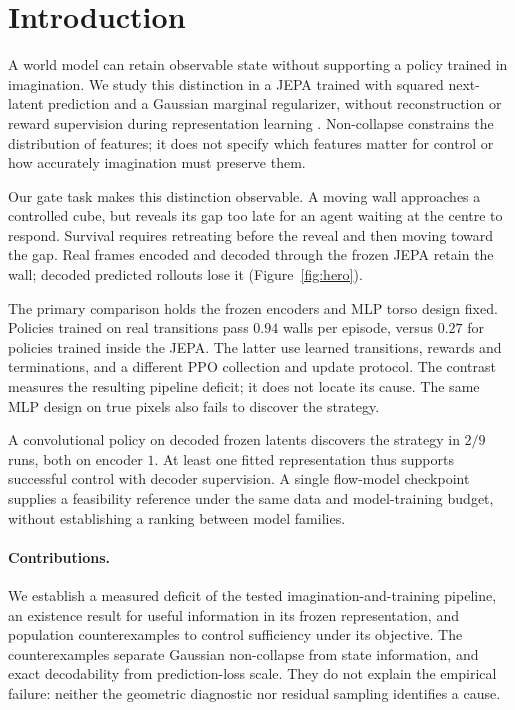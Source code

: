 \section{Introduction}
\label{sec:intro}

A world model can retain observable state without supporting a policy trained in imagination.
We study this distinction in a JEPA trained with squared next-latent prediction and a Gaussian
marginal regularizer, without reconstruction or reward supervision during representation learning
\citep{maes2026lewm,balestriero2025lejepa}. Non-collapse constrains the distribution of features;
it does not specify which features matter for control or how accurately imagination must preserve them.

Our gate task makes this distinction observable. A moving wall approaches a controlled cube,
but reveals its gap too late for an agent waiting at the centre to respond. Survival requires
retreating before the reveal and then moving toward the gap. Real frames encoded and decoded through
the frozen JEPA retain the wall; decoded predicted rollouts lose it (Figure~\ref{fig:hero}).


The primary comparison holds the frozen encoders and MLP torso design fixed. Policies trained on
real transitions pass $0.94$ walls per episode, versus $0.27$ for policies trained inside the JEPA.
The latter use learned transitions, rewards and terminations, and a different PPO collection and
update protocol. The contrast measures the resulting pipeline deficit; it does not locate its cause.
The same MLP design on true pixels also fails to discover the strategy.

A convolutional policy on decoded frozen latents discovers the strategy in $2/9$ runs, both on
encoder $1$. At least one fitted representation thus supports successful control with decoder supervision.
A single flow-model checkpoint supplies a feasibility reference under the same data and model-training
budget, without establishing a ranking between model families.

\paragraph{Contributions.} We establish a measured deficit of the tested imagination-and-training
pipeline, an existence result for useful information in its frozen representation, and population
counterexamples to control sufficiency under its objective. The counterexamples separate Gaussian
non-collapse from state information, and exact decodability from prediction-loss scale. They do not
explain the empirical failure: neither the geometric diagnostic nor residual sampling identifies a cause.

